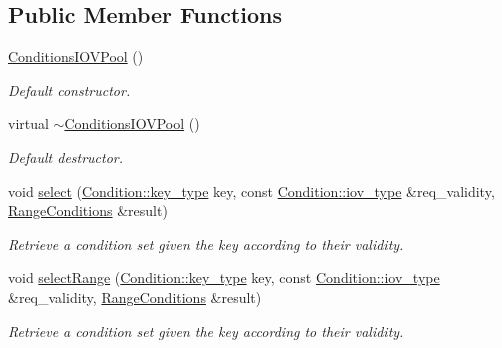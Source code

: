 \subsection*{Public Member Functions}
\begin{DoxyCompactItemize}
\item 
\hyperlink{class_d_d4hep_1_1_conditions_1_1_conditions_i_o_v_pool_a8ccf22020bacb07028aea997d172c7d0}{Conditions\+I\+O\+V\+Pool} ()
\begin{DoxyCompactList}\small\item\em Default constructor. \end{DoxyCompactList}\item 
virtual \hyperlink{class_d_d4hep_1_1_conditions_1_1_conditions_i_o_v_pool_a58a9a1f3f6d282fa24c00010193da303}{$\sim$\+Conditions\+I\+O\+V\+Pool} ()
\begin{DoxyCompactList}\small\item\em Default destructor. \end{DoxyCompactList}\item 
void \hyperlink{class_d_d4hep_1_1_conditions_1_1_conditions_i_o_v_pool_a75f43e7cd7cbc5c07afb0aca2b241a41}{select} (\hyperlink{class_d_d4hep_1_1_conditions_1_1_condition_a7528efa762e8cc072ef80ea67c3531f9}{Condition\+::key\+\_\+type} key, const \hyperlink{class_d_d4hep_1_1_conditions_1_1_condition_ad84300e226b2085ec5e9db7f47be5539}{Condition\+::iov\+\_\+type} \&req\+\_\+validity, \hyperlink{namespace_d_d4hep_1_1_conditions_ae765f0140a33973a430280f02b6062f4}{Range\+Conditions} \&result)
\begin{DoxyCompactList}\small\item\em Retrieve a condition set given the key according to their validity. \end{DoxyCompactList}\item 
void \hyperlink{class_d_d4hep_1_1_conditions_1_1_conditions_i_o_v_pool_a09fb206aaa3c86d249598b7eaa58b322}{select\+Range} (\hyperlink{class_d_d4hep_1_1_conditions_1_1_condition_a7528efa762e8cc072ef80ea67c3531f9}{Condition\+::key\+\_\+type} key, const \hyperlink{class_d_d4hep_1_1_conditions_1_1_condition_ad84300e226b2085ec5e9db7f47be5539}{Condition\+::iov\+\_\+type} \&req\+\_\+validity, \hyperlink{namespace_d_d4hep_1_1_conditions_ae765f0140a33973a430280f02b6062f4}{Range\+Conditions} \&result)
\begin{DoxyCompactList}\small\item\em Retrieve a condition set given the key according to their validity. \end{DoxyCompactList}\item 

\end{DoxyCompactItemize}
